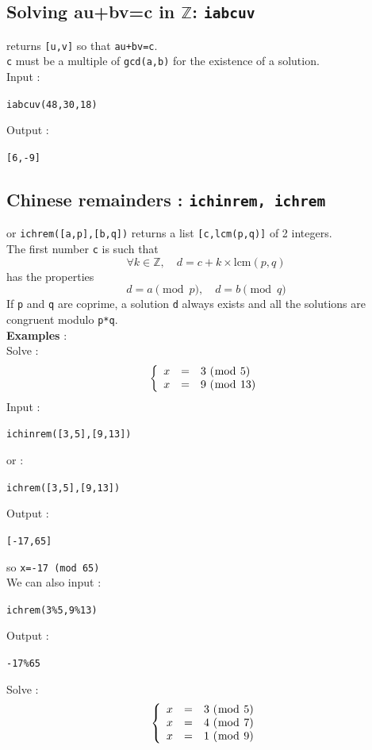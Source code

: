 \documentclass[a4paper,11pt]{book}
\newcommand{\Z}{{\mathbb{Z}}}
\begin{document}
\subsection{Solving au+bv=c in $\Z$: {\tt iabcuv}}
 returns {\tt [u,v]} so that {\tt au+bv=c}.\\
{\tt c} must be a multiple of {\tt gcd(a,b)} for the existence of
a solution.\\
Input :
\begin{center}{\tt iabcuv(48,30,18) }\end{center}
Output :
\begin{center}{\tt [6,-9]}\end{center}

\subsection{Chinese remainders : {\tt ichinrem, ichrem}}
 or {\tt ichrem([a,p],[b,q])} returns a 
list {\tt [c,lcm(p,q)]} of 2 integers.\\
The first number {\tt c} is such that 
\[ \forall k \in \mathbb Z, \quad d=c+ k \times \mbox{lcm}(p,q) \]
has the properties
\[ d=a \pmod  p, \quad d=b \pmod q \]
If {\tt p} and {\tt q} are coprime, a solution {\tt d} always exists
and all the solutions are congruent modulo {\tt p*q}.\\
{\bf Examples} : \\
Solve :
$${\tt \left \{ \begin{array}{rcl} x&=&3\ (\bmod\ 5)\\ 
x&=&9\ (\bmod\ 13) \end{array}\right.}$$
Input :
\begin{center}{\tt ichinrem([3,5],[9,13])}\end{center}
or :
\begin{center}{\tt ichrem([3,5],[9,13])}\end{center}
Output :
\begin{center}{\tt [-17,65] }\end{center}
so {\tt x=-17 (mod 65)}\\
We can also input :
\begin{center}{\tt ichrem(3\%5,9\%13)}\end{center}
Output :
\begin{center}{\tt -17\%65 }\end{center}
Solve :
$${\tt \left \{ \begin{array}{rcl} x&=&3\ (\bmod\ 5)\\ 
x&=&4\ (\bmod\ 7) \\ 
x&=&1\ (\bmod\ 9)\end{array}\right.}$$
\end{document}
